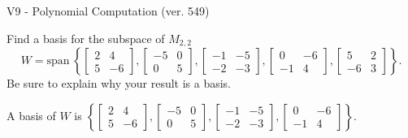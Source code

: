 \begin{exercise}
  \begin{exerciseTitle}V9 - Polynomial Computation (ver. 549)\end{exerciseTitle}
  \begin{exerciseStatement}
    Find a basis for the subspace of \(M_{2,2}\) 
\[W=\mathrm{span}\ \left\{\left[\begin{array}{cc}
2 & 4 \\
5 & -6
\end{array}\right] , \left[\begin{array}{cc}
-5 & 0 \\
0 & 5
\end{array}\right] , \left[\begin{array}{cc}
-1 & -5 \\
-2 & -3
\end{array}\right] , \left[\begin{array}{cc}
0 & -6 \\
-1 & 4
\end{array}\right] , \left[\begin{array}{cc}
5 & 2 \\
-6 & 3
\end{array}\right]\right\}.\]
 Be sure to explain why your result is a basis.


  \end{exerciseStatement}
  \begin{exerciseAnswer}
   A basis of \(W\) is  \(\left\{\left[\begin{array}{cc}
2 & 4 \\
5 & -6
\end{array}\right] , \left[\begin{array}{cc}
-5 & 0 \\
0 & 5
\end{array}\right] , \left[\begin{array}{cc}
-1 & -5 \\
-2 & -3
\end{array}\right] , \left[\begin{array}{cc}
0 & -6 \\
-1 & 4
\end{array}\right]\right\}\).
  


  \end{exerciseAnswer}
\end{exercise}